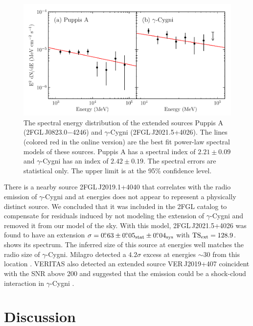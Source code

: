 \begin{figure}[htbp]
  \includegraphics{chapters/extended_search/figures/summary_plots/snr_seds_color.pdf}
  \caption{The spectral energy distribution of the extended sources Puppis
  A (2FGL\,J0823.0$-$4246) and $\gamma$-Cygni (2FGL\,J2021.5+4026).
  The lines (colored red in the online version) are the best fit
  power-law spectral models of these sources. Puppis A has a spectral
  index of $2.21\pm0.09$ and $\gamma$-Cygni has an index of $2.42\pm0.19$.
  The spectral errors are statistical only.  The upper limit is at the
  95\% confidence level.}
\end{figure}

There is a nearby source 2FGL\,J2019.1+4040 that correlates with the
radio emission of $\gamma$-Cygni and at \gev energies does not appear
to represent a physically distinct source.  We concluded that it was
included in the 2FGL catalog to compensate for residuals induced by
not modeling the extension of $\gamma$-Cygni and removed it from our
model of the sky.  With this model, 2FGL\,J2021.5+4026 was found to
have an extension $\sigma=0\mbox{$.\!\!^\circ$}63\pm0\mbox{$.\!\!^\circ$}05_\text{stat}\pm0\mbox{$.\!\!^\circ$}04_\text{sys}$
with $\mathrm{TS}_\mathrm{ext}=128.9$.   shows its spectrum.
The inferred size of this source at \gev energies well
matches the radio size of $\gamma$-Cygni.  Milagro detected a
$4.2\sigma$ excess at energies $\sim 30$ \tev from this location
\citep{abdo_2009a_fermi/large-telescope,abdo_2009a_milagro-observations}.
VERITAS also detected an extended source VER\,J2019+407
coincident with the SNR above 200 \gev and suggested that the
\tev emission could be a shock-cloud interaction in $\gamma$-Cygni
\citep{weinstein_2009a_veritas-survey}.

\section{Discussion}

